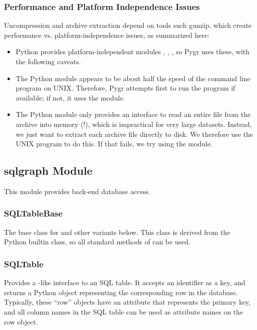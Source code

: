 \documentclass{howto}
\begin{document}
\subsubsection{Performance and Platform Independence Issues}
Uncompression and archive extraction depend on tools such gunzip,
which create performance vs. platform-independence issues, as
summarized here:
\begin{itemize}
\item Python provides platform-independent modules ,
, , so Pygr uses these, with the following
caveats.

\item The Python module  appears to be about half the 
speed of the command line program  on UNIX.  Therefore,
Pygr attempts first to run the  program if available; if 
not, it uses the  module.

\item The Python module  only provides an interface
to read an entire file from the archive into memory (!), which is
impractical for very large datasets.  Instead, we just want to extract
each archive file directly to disk.  We therefore use the UNIX 
program  to do this.  If that fails, we try using 
the  module.
\end{itemize}

\subsection{sqlgraph Module}
\label{sqlgraph-module}
This module provides back-end database access.

\subsubsection{SQLTableBase}
The base class for  and other variants below.
This class is derived from
the Python builtin  class, so all standard methods of 
can be used.

\subsubsection{SQLTable}
Provides a -like interface to an SQL table.  It accepts
an identifier as a key, and returns a Python object representing
the corresponding row in the database.  Typically, these ``row''
objects have an  attribute that represents the
primary key, and all column names in the SQL table can be
used as attribute names on the row object.
\end{document}
